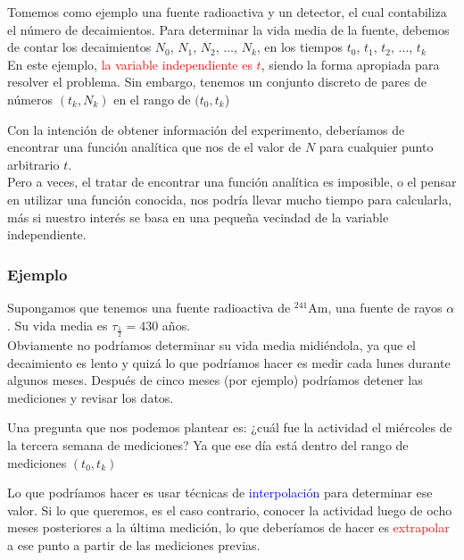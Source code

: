 \begin{frame}
Tomemos como ejemplo una fuente radioactiva y un detector, el cual contabiliza el número de decaimientos. Para determinar la vida media de la fuente, debemos de contar los decaimientos $N_{0}$, $N_{1}$, $N_{2}$, $\ldots$, $N_{k}$, en los tiempos $t_{0}$, $t_{1}$, $t_{2}$, $\ldots$, $t_{k}$
\\
\bigskip
En este ejemplo, \textcolor{red}{la variable independiente es $t$}, siendo la forma  apropiada para resolver el problema. Sin embargo, tenemos un conjunto discreto de pares de números $(t_{k},N_{k})$ en el rango de $(t_{0}, t_{k}$)
\end{frame}
\begin{frame}
Con la intención de obtener información del experimento, deberíamos de encontrar una función analítica que nos de el valor de $N$ para cualquier punto arbitrario $t$.
\\
\bigskip
Pero a veces, el tratar de encontrar una función analítica es imposible, o el pensar en utilizar una función conocida, nos podría llevar mucho tiempo para calcularla, más si nuestro interés se basa en una pequeña vecindad de la variable independiente.
\end{frame}
\begin{frame}
\frametitle{Ejemplo}
Supongamos que tenemos una fuente radioactiva de {}$^{241}$Am, una fuente de rayos $\alpha$. Su vida media es $\tau_{\frac{1}{2}}=430$ años.
\\
\bigskip
Obviamente no podríamos determinar su vida media midiéndola, ya que el decaimiento es lento y quizá lo que podríamos hacer es medir cada lunes durante algunos meses. Después de cinco meses (por ejemplo) podríamos detener las mediciones y revisar los datos.
\end{frame}
\begin{frame}
Una pregunta que nos podemos plantear es: ¿cuál fue la actividad el miércoles de la tercera semana de mediciones?  Ya que ese día está dentro del rango de mediciones $(t_{0}, t_{k})$
\end{frame}
\begin{frame}
Lo que podríamos hacer es usar técnicas de \textcolor{blue}{interpolación} para determinar ese valor.  Si lo que queremos, es el caso contrario, conocer la actividad luego de ocho meses posteriores a la última medición, lo que deberíamos de hacer es \textcolor{red}{extrapolar} a ese punto a partir de las mediciones previas.
\end{frame}
